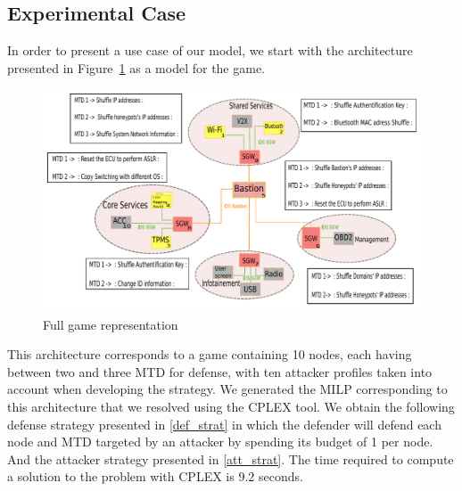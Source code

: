 \label{expe}

\subsection{Experimental Case}
\label{expe_case}

{\huge I}n order to present a use case of our model, we start with the architecture presented in Figure~\ref{fig:archi_mtd} as a model for the game. 

\begin{figure}[h]
    \centering
    \includegraphics[width=1\textwidth]{schema/archi_comp.pdf}
    \caption{Full game representation}
    \label{fig:archi_mtd}
\end{figure}

This architecture corresponds to a game containing 10 nodes, each having between two and three MTD for defense, with ten attacker profiles taken into account when developing the strategy.
We generated the MILP corresponding to this architecture that we resolved using the CPLEX tool. We obtain the following defense strategy presented in \ref{def_strat} in which the defender will defend each node and MTD targeted by an attacker by spending its budget of 1 per node.  And the attacker strategy presented in \ref{att_strat}.
The time required to compute a solution to the problem with CPLEX is $9.2$ seconds.


